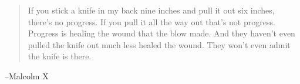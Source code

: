 \documentclass{exam}
\begin{document}
  \else
    \vspace{9 cm}
    \begin{quote}
      \begin{em}
        If you stick a knife in my back nine inches and pull it out six inches, there's
        no progress. If you pull it all the way out that's not progress. Progress is
        healing the wound that the blow made. And they haven't even pulled the knife
        out much less healed the wound. They won't even admit the knife is there. 
      \end{em}
    \end{quote}
    \hspace{1 cm} --Malcolm X
  \fi
\end{document}
